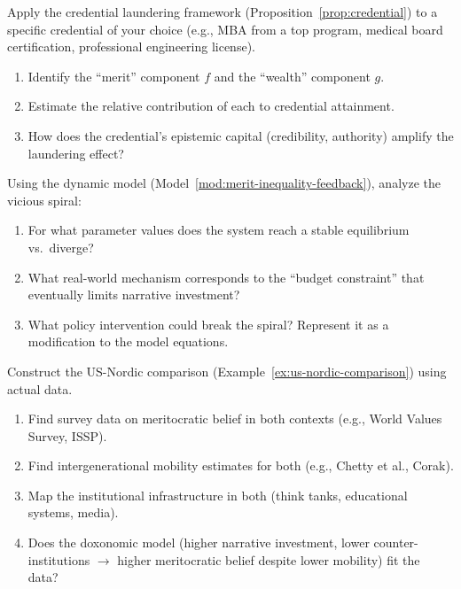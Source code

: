 \begin{exercise}
Apply the credential laundering framework (Proposition~\ref{prop:credential}) to a specific credential of your choice (e.g., MBA from a top program, medical board certification, professional engineering license).
\begin{enumerate}[nosep]
  \item Identify the ``merit'' component $f$ and the ``wealth'' component $g$.
  \item Estimate the relative contribution of each to credential attainment.
  \item How does the credential's epistemic capital (credibility, authority) amplify the laundering effect?
\end{enumerate}
\end{exercise}

\begin{exercise}
Using the dynamic model (Model~\ref{mod:merit-inequality-feedback}), analyze the vicious spiral:
\begin{enumerate}[nosep]
  \item For what parameter values does the system reach a stable equilibrium vs.\ diverge?
  \item What real-world mechanism corresponds to the ``budget constraint'' that eventually limits narrative investment?
  \item What policy intervention could break the spiral? Represent it as a modification to the model equations.
\end{enumerate}
\end{exercise}

\begin{exercise}
Construct the US-Nordic comparison (Example~\ref{ex:us-nordic-comparison}) using actual data.
\begin{enumerate}[nosep]
  \item Find survey data on meritocratic belief in both contexts (e.g., World Values Survey, ISSP).
  \item Find intergenerational mobility estimates for both (e.g., Chetty et al., Corak).
  \item Map the institutional infrastructure in both (think tanks, educational systems, media).
  \item Does the doxonomic model (higher narrative investment, lower counter-institutions $\to$ higher meritocratic belief despite lower mobility) fit the data?
\end{enumerate}
\end{exercise}

